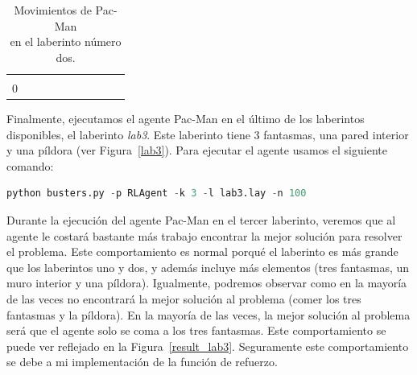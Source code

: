 \documentclass[11pt]{exam}
\begin{document}
\begin{table}[H]
\begin{tabular}{cccccccccc}
		\multicolumn{1}{c|}{} &
		\multicolumn{1}{c|}{} &
		\multicolumn{1}{c|}{} &
		\multicolumn{1}{c|}{} &
		\multicolumn{1}{c|}{} &
		\cellcolor[HTML]{000000} \\ \cline{2-9}
		\multicolumn{1}{c|}{0} &
		\multicolumn{1}{c|}{\cellcolor[HTML]{000000}} &
		\multicolumn{1}{c|}{\cellcolor[HTML]{000000}} &
		\multicolumn{1}{c|}{\cellcolor[HTML]{000000}} &
		\multicolumn{1}{c|}{\cellcolor[HTML]{000000}} &
		\multicolumn{1}{c|}{\cellcolor[HTML]{000000}} &
		\multicolumn{1}{c|}{\cellcolor[HTML]{000000}} &
		\multicolumn{1}{c|}{\cellcolor[HTML]{000000}} &
		\multicolumn{1}{c|}{\cellcolor[HTML]{000000}} &
		\cellcolor[HTML]{000000} \\ \cline{2-9}
	\end{tabular}
	\caption{Movimientos de Pac-Man \\ en el laberinto número dos.}
	\label{tabla_lab2}
\end{table}

Finalmente, ejecutamos el agente Pac-Man en el último de los laberintos disponibles, el laberinto \textit{lab3}. Este laberinto tiene 3 fantasmas, una pared interior y una píldora (ver Figura~\ref{lab3}). Para ejecutar el agente usamos el siguiente comando:
\vspace*{2mm}

\begin{lstlisting}[language=python, basicstyle=\footnotesize]
python busters.py -p RLAgent -k 3 -l lab3.lay -n 100
\end{lstlisting}
\vspace*{2mm}

Durante la ejecución del agente Pac-Man en el tercer laberinto, veremos que al agente le costará bastante más trabajo encontrar la mejor solución para resolver el problema. Este comportamiento es normal porqué el laberinto es más grande que los laberintos uno y dos, y además incluye más elementos (tres fantasmas, un muro interior y una píldora). Igualmente, podremos observar como en la mayoría de las veces no encontrará la mejor solución al problema (comer los tres fantasmas y la píldora). En la mayoría de las veces, la mejor solución al problema será que el agente solo se coma a los tres fantasmas. Este comportamiento se puede ver reflejado en la Figura~\ref{result_lab3}. Seguramente este comportamiento se debe a mi implementación de la función de refuerzo. 
\end{document}
